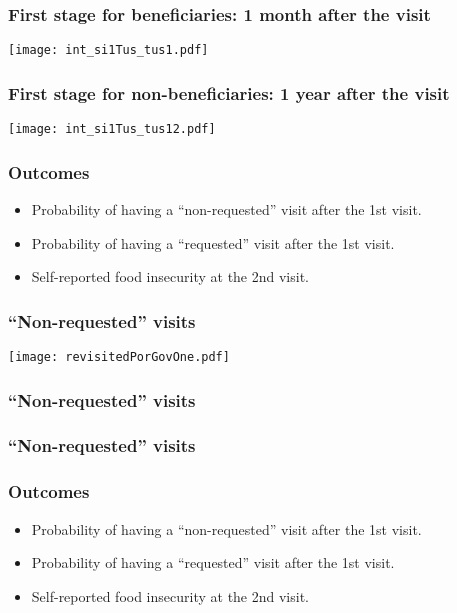 \documentclass{beamer}
\begin{document}
\begin{frame}
\frametitle{First stage for beneficiaries: 1 month after the visit}
\begin{center}
	\texttt{[image: int\_si1Tus\_tus1.pdf]}
	\label{int_si1Tus_tus1}
\end{center}
\end{frame}

\begin{frame}
\frametitle{First stage for non-beneficiaries: 1 year after the visit}
\begin{center}
\texttt{[image: int\_si1Tus\_tus12.pdf]}
\label{int_si1Tus_tus12.pdf}
\end{center}
\end{frame}

\begin{frame}
\frametitle{Outcomes}
\begin{itemize}
	\item Probability of having a ``non-requested'' visit after the 1st visit.
	\item {\color{gray}Probability of having a ``requested'' visit after the 1st visit.}
	\item {\color{gray}Self-reported food insecurity at the 2nd visit.}
\end{itemize}
\end{frame}

\begin{frame}
\frametitle{``Non-requested'' visits}
\begin{center}
	\texttt{[image: revisitedPorGovOne.pdf]}
	\label{revisitedPorGovOne}
\end{center}
\end{frame}

\begin{frame}
\frametitle{``Non-requested'' visits}
\begin{figure}

\end{figure}
\end{frame}

\begin{frame}
\frametitle{``Non-requested'' visits}
\begin{figure}

\end{figure}
\end{frame}

\begin{frame}
\frametitle{Outcomes}
\begin{itemize}
	\item {\color{gray}Probability of having a ``non-requested'' visit after the 1st visit.}
	\item Probability of having a ``requested'' visit after the 1st visit.
	\item {\color{gray}Self-reported food insecurity at the 2nd visit.}
\end{itemize}
\end{frame}
\end{document}
